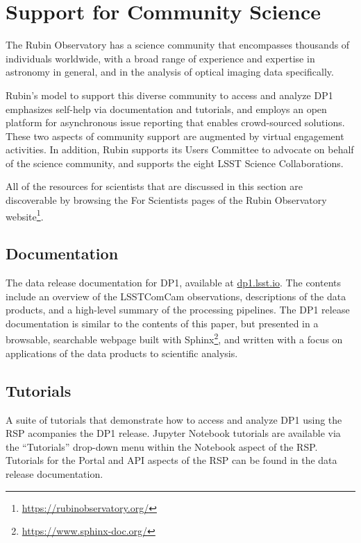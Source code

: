 \section{Support for Community Science
\label{sec:community_science}}

The Rubin Observatory has a science community that encompasses thousands of individuals worldwide, with a broad range of experience and expertise in astronomy in general, and in the analysis of optical imaging data specifically.

Rubin's model to support this diverse community to access and analyze \gls{DP1} emphasizes self-help via documentation and tutorials, and employs an open platform for asynchronous issue reporting that enables crowd-sourced solutions.
These two aspects of community support are augmented by virtual engagement activities.
In addition, Rubin supports its Users Committee to advocate on behalf of the science community, and supports the eight \gls{LSST} Science Collaborations.

All of the resources for scientists that are discussed in this section are discoverable by browsing the For Scientists pages of the Rubin Observatory website\footnote{\url{https://rubinobservatory.org/}}.

\subsection{Documentation
\label{ssec:documentation}}

The data release documentation for \gls{DP1}, available at \url{dp1.lsst.io}.
The contents include an overview of the \gls{LSSTComCam} observations, descriptions of the data products, and a high-level summary of the processing pipelines.
The DP1 release documentation is similar to the contents of this paper, but presented in a browsable, searchable webpage built with Sphinx\footnote{\url{https://www.sphinx-doc.org/}}, and written with a focus on applications of the data products to scientific analysis.

\subsection{Tutorials
\label{ssec:tutorials}}

A suite of tutorials that demonstrate how to access and analyze \gls{DP1} using the RSP acompanies the DP1 release.
Jupyter Notebook tutorials are available via the ``Tutorials'' drop-down menu within the Notebook aspect of the \gls{RSP}.
Tutorials for the Portal and API aspects of the \gls{RSP} can be found in the data release documentation.

